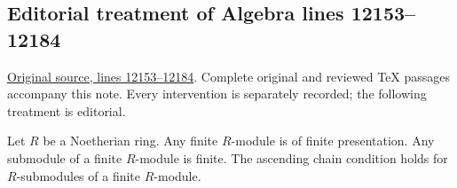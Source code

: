 

























\subsection{Editorial treatment of Algebra lines 12153--12184}

\hypertarget{algebra-context-158}{}

\noindent\href{https://github.com/stacks/stacks-project/blob/a04446e57ec1fbc252a871afcec7752fb2807b14/algebra.tex\#L12153}{Original source, lines 12153--12184}. Complete original and reviewed TeX passages accompany this note. Every intervention is separately recorded; the following treatment is editorial.


\begin{lemma}
\label{editorial-source-lemma-Noetherian-basic}
Let $R$ be a Noetherian ring.
Any finite $R$-module is of finite presentation.
Any submodule of a finite $R$-module is finite.
The ascending chain condition holds for $R$-submodules
of a finite $R$-module.
\end{lemma}

